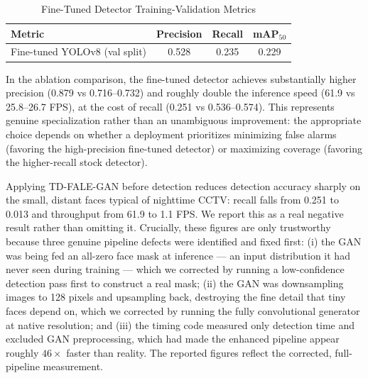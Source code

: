 \documentclass[conference]{IEEEtran}
\begin{document}
\begin{table}[!t]
\caption{Fine-Tuned Detector Training-Validation Metrics}
\label{tab:val}
\centering
\begin{tabular}{lccc}
\toprule
\textbf{Metric} & \textbf{Precision} & \textbf{Recall} &
\textbf{mAP$_{50}$} \\
\midrule
Fine-tuned YOLOv8 (val split) & 0.528 & 0.235 & 0.229 \\
\bottomrule
\end{tabular}
\end{table}

\begin{table}[!t]
\caption{Ablation Detection Results (600 DARK FACE images,
4{,}922 faces)}
\label{tab:detection}
\centering
{}
\end{table}

In the ablation comparison, the fine-tuned detector achieves
substantially higher precision (0.879 vs 0.716--0.732) and
roughly double the inference speed (61.9 vs 25.8--26.7 FPS), at
the cost of recall (0.251 vs 0.536--0.574). This represents
genuine specialization rather than an unambiguous improvement:
the appropriate choice depends on whether a deployment
prioritizes minimizing false alarms (favoring the high-precision
fine-tuned detector) or maximizing coverage (favoring the
higher-recall stock detector).

Applying TD-FALE-GAN before detection reduces detection accuracy
sharply on the small, distant faces typical of nighttime CCTV:
recall falls from 0.251 to 0.013 and throughput from 61.9 to 1.1
FPS. We report this as a real negative result rather than
omitting it. Crucially, these figures are only trustworthy
because three genuine pipeline defects were identified and fixed
first: (i) the GAN was being fed an all-zero face mask at
inference --- an input distribution it had never seen during
training --- which we corrected by running a low-confidence
detection pass first to construct a real mask; (ii) the GAN was
downsampling images to 128 pixels and upsampling back, destroying
the fine detail that tiny faces depend on, which we corrected by
running the fully convolutional generator at native resolution;
and (iii) the timing code measured only detection time and
excluded GAN preprocessing, which had made the enhanced pipeline
appear roughly $46\times$ faster than reality. The reported
figures reflect the corrected, full-pipeline measurement.
\end{document}
